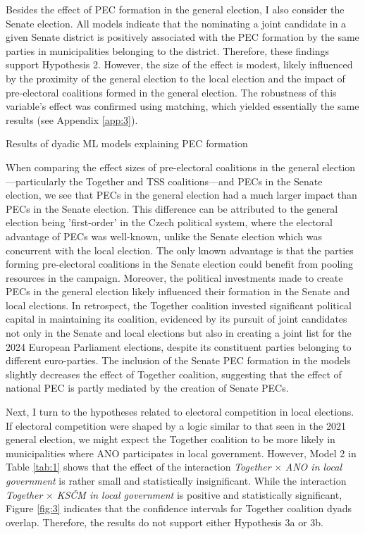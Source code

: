 \documentclass[]{interact}
\theoremstyle{plain}%
\theoremstyle{definition}
\theoremstyle{remark}
\begin{document}
Besides the effect of PEC formation in the general election, I also consider the Senate election. All models indicate that the nominating a joint candidate in a given Senate district is positively associated with the PEC formation by the same parties in municipalities belonging to the district. Therefore, these findings support Hypothesis 2. However, the size of the effect is modest, likely influenced by the proximity of the general election to the local election and the impact of pre-electoral coalitions formed in the general election.
The robustness of this variable's effect was confirmed using matching, which yielded essentially the same results (see Appendix \ref{app:3}).

\begin{table}[!h]
\caption{Results of dyadic ML models explaining PEC formation}
\label{tab:1}
\centering
\begin{adjustbox}{max width=6in}

\end{adjustbox}
\end{table}

When comparing the effect sizes of pre-electoral coalitions in the general election—particularly the Together and TSS coalitions—and PECs in the Senate election, we see that PECs in the general election had a much larger impact than PECs in the Senate election. This difference can be attributed to the general election being 'first-order' in the Czech political system, where the electoral advantage of PECs was well-known, unlike the Senate election which was concurrent with the local election. The only known advantage is that the parties forming pre-electoral coalitions in the Senate election could benefit from pooling resources in the campaign. Moreover, the political investments made to create PECs in the general election likely influenced their formation in the Senate and local elections. In retrospect, the Together coalition invested significant political capital in maintaining its coalition, evidenced by its pursuit of joint candidates not only in the Senate and local elections but also in creating a joint list for the 2024 European Parliament elections, despite its constituent parties belonging to different euro-parties. The inclusion of the Senate PEC formation in the models slightly decreases the effect of Together coalition, suggesting that the effect of national PEC is partly mediated by the creation of Senate PECs.

Next, I turn to the hypotheses related to electoral competition in local elections. If electoral competition were shaped by a logic similar to that seen in the 2021 general election, we might expect the Together coalition to be more likely in municipalities where ANO participates in local government. However, Model 2 in Table \ref{tab:1} shows that the effect of the interaction \emph{Together} $\times$ \emph{ANO in local government} is rather small and statistically insignificant. While the interaction \emph{Together} $\times$ \emph{KSČM in local government} is positive and statistically significant, Figure \ref{fig:3} indicates that the confidence intervals for Together coalition dyads overlap. Therefore, the results do not support either Hypothesis 3a or 3b.
\end{document}
